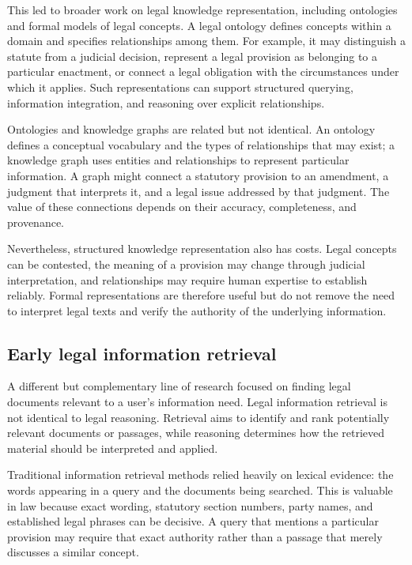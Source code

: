 This led to broader work on legal knowledge representation, including ontologies and formal models
of legal concepts. A legal ontology defines concepts within a domain and specifies relationships
among them. For example, it may distinguish a statute from a judicial decision, represent a legal
provision as belonging to a particular enactment, or connect a legal obligation with the
circumstances under which it applies. Such representations can support structured querying,
information integration, and reasoning over explicit relationships.

Ontologies and knowledge graphs are related but not identical. An ontology defines a conceptual
vocabulary and the types of relationships that may exist; a knowledge graph uses entities and
relationships to represent particular information. A graph might connect a statutory provision to an
amendment, a judgment that interprets it, and a legal issue addressed by that judgment. The value of
these connections depends on their accuracy, completeness, and provenance.

Nevertheless, structured knowledge representation also has costs. Legal concepts can be contested,
the meaning of a provision may change through judicial interpretation, and relationships may require
human expertise to establish reliably. Formal representations are therefore useful but do not remove
the need to interpret legal texts and verify the authority of the underlying information.

\subsection{Early legal information retrieval}

A different but complementary line of research focused on finding legal documents relevant to a
user's information need. Legal information retrieval is not identical to legal reasoning. Retrieval
aims to identify and rank potentially relevant documents or passages, while reasoning determines how
the retrieved material should be interpreted and applied.

Traditional information retrieval methods relied heavily on lexical evidence: the words appearing in
a query and the documents being searched. This is valuable in law because exact wording, statutory
section numbers, party names, and established legal phrases can be decisive. A query that mentions a
particular provision may require that exact authority rather than a passage that merely discusses a
similar concept.

